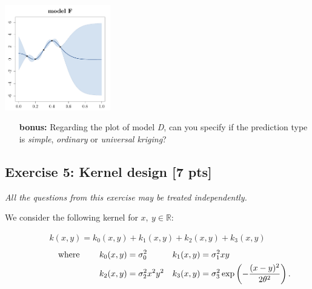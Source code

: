 \documentclass[a4paper,10pt]{article}
\begin{document}
\begin{center}
  \includegraphics[width=4.6cm]{figures/exo_kriging_6.pdf}
\end{center}
\medskip
\begin{enumerate}[label=Q\arabic*.]
\item[\textbf{bonus:}] Regarding the plot of model \emph{D}, can you specify if the prediction type is \emph{simple}, \emph{ordinary} or \emph{universal kriging}?
\end{enumerate}

\subsection*{Exercise 5: Kernel design \hfill [7 pts]}
\begin{center}
  \emph{All the questions from this exercise may be treated independently.}
\end{center}
We consider the following kernel for $x,\ y \in \mathds{R} $:

\begin{align*}
 k(x,y)= k_0(x,y) + k_1(x,y) + k_2(x,y) + k_3(x,y)
\end{align*}
\begin{align*}
 \text{\qquad \qquad where \qquad} k_0(x,y)&=\sigma_0^2   &  k_1(x,y)&=\sigma_1^2 xy \\
 k_2(x,y)&= \sigma_2^2 x^2y^2 & k_3(x,y)&=\sigma_3^2 \exp \left(-\frac{(x-y)^2}{2 \theta^2} \right) .
\end{align*}
\end{document}

